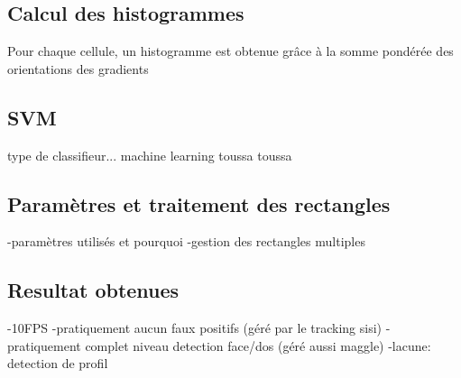 \documentclass[11pt]{article}
\begin{document}
\subsection{Calcul des histogrammes}
Pour chaque cellule, un histogramme est obtenue grâce à la somme pondérée des orientations des gradients 

\subsection{SVM}
type de classifieur... machine learning toussa toussa

\subsection{Paramètres et traitement des rectangles}
-paramètres utilisés et pourquoi
-gestion des rectangles multiples

\subsection{Resultat obtenues}
-10FPS
-pratiquement aucun faux positifs
(géré par le tracking sisi)
-pratiquement complet niveau detection face/dos
(géré aussi maggle)
-lacune: detection de profil

\end{document}
